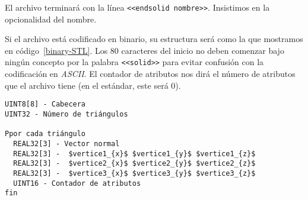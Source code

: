 El archivo terminará con la línea \texttt{<<endsolid nombre>>}. Insistimos en la opcionalidad del nombre.

Si el archivo está codificado en binario, su estructura será como la que mostramos en código~\ref{binary-STL}. Los 80 caracteres del inicio no deben comenzar bajo ningún concepto por la palabra \texttt{<<solid>>} para evitar confusión con la codificación en \textit{ASCII}. El contador de atributos nos dirá el número de atributos que el archivo tiene (en el estándar, este será 0).

\begin{lstlisting}[mathescape=true, frame=single, float, caption=Formato \textit{STL} binario, label=binary-STL]
UINT8[8] - Cabecera
UINT32 - Número de triángulos

Ppor cada triángulo
  REAL32[3] - Vector normal
  REAL32[3] -  $vertice1_{x}$ $vertice1_{y}$ $vertice1_{z}$
  REAL32[3] -  $vertice2_{x}$ $vertice2_{y}$ $vertice2_{z}$
  REAL32[3] -  $vertice3_{x}$ $vertice3_{y}$ $vertice3_{z}$
  UINT16 - Contador de atributos
fin
\end{lstlisting}